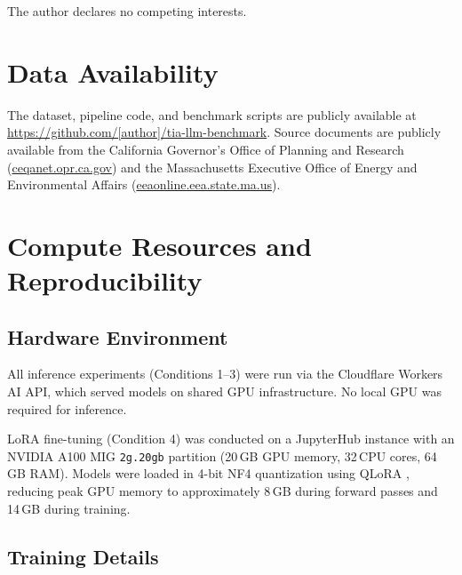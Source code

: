 \documentclass[preprint,12pt]{elsarticle}
\begin{document}
The author declares no competing interests.

\section*{Data Availability}

The dataset, pipeline code, and benchmark scripts are publicly available at
\url{https://github.com/[author]/tia-llm-benchmark}.
Source documents are publicly available from the California Governor's Office
of Planning and Research (\url{ceqanet.opr.ca.gov}) and the Massachusetts
Executive Office of Energy and Environmental Affairs
(\url{eeaonline.eea.state.ma.us}).

\appendix

\section{Compute Resources and Reproducibility}
\label{app:compute}

\subsection{Hardware Environment}

All inference experiments (Conditions 1--3) were run via the
Cloudflare Workers AI API, which served models on shared GPU infrastructure.
No local GPU was required for inference.

LoRA fine-tuning (Condition 4) was conducted on a JupyterHub instance with
an NVIDIA A100 MIG \texttt{2g.20gb} partition (20\,GB GPU memory,
32\,CPU cores, 64\,GB RAM).
Models were loaded in 4-bit NF4 quantization using QLoRA
\citep{dettmers2023qlora}, reducing peak GPU memory to approximately 8\,GB
during forward passes and 14\,GB during training.

\subsection{Training Details}
\end{document}
